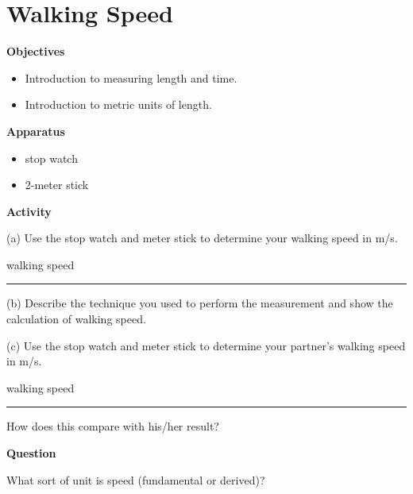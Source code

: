 
\section{Walking Speed}

\makelabheader %

\bigskip

\textbf{Objectives}
\begin{itemize}
\item Introduction to measuring length and time.
\item Introduction to metric units of length. 
\end{itemize}

\bigskip
\textbf{Apparatus}
\begin{itemize}
\item stop watch
\item 2-meter stick
\end{itemize}
\textbf{Activity}

(a) Use the stop watch and meter stick to determine your walking speed in m/s.

walking speed \rule{2.0in}{0.1pt}

(b) Describe the technique you used to perform the measurement and show the calculation of walking speed.
\vspace{30mm}

(c) Use the stop watch and meter stick to determine your partner's walking speed in m/s.

walking speed \rule{2.0in}{0.1pt}  How does this compare with his/her result?
\vspace{20mm}

\textbf{Question}

What sort of unit is speed (fundamental or derived)?

